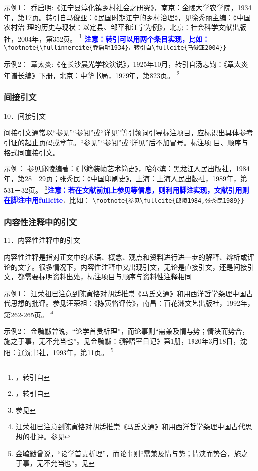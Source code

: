 \documentclass{article}
\newcommand{\qd}[1]{\textbf{\textcolor{blue}{#1}}}
\begin{document}
示例1：
乔启明:《江宁县淳化镇乡村社会之研究》，南京：金陵大学农学院，1934年，第17页。转引自马俊亚：《民国时期江宁的乡村治理》，见徐秀丽主编：《中国农村治
理的历史与现状：以定县、邹平和江宁为例》，北京：社会科学文献出版社，2004年，第352页。
\footnote{，转引自}
\qd{注意：转引可以用两个条目实现，比如：}
\verb|\footnote{\fullinnercite{乔启明1934}，转引自\fullcite{马俊亚2004}}|

示例2：
章太炎:《在长沙晨光学校演说》，1925年10月，转引自汤志钧：《章太炎年谱长编》下册，北京：中华书局，1979年，第823页。
\footnote{，转引自}


\subsubsection{间接引文}
10．间接引文

间接引文通常以“参见”“参阅”或“详见”等引领词引导标注项目，应标识出具体参考引证的起止页码或章节。“参见”“参阅”或“详见”后不加冒号。标注项
目、顺序与格式同直接引文。

示例：
参见邱陵编著：《书籍装帧艺术简史》，哈尔滨：黑龙江人民出版社，1984年，第28－29页；张秀民：《中国印刷史》，上海：上海人民出版社，1989年，第531－32页。
\footnote{参见}\qd{注意：若在文献前加上参见等信息，则利用脚注实现，文献引用则在脚注中用fullcite}，比如：
\verb|\footnote{参见\fullcite{邱陵1984,张秀民1989}}|


\subsubsection{内容性注释中的引文}
11．内容性注释中的引文

内容性注释是指对正文中的术语、概念、观点和资料进行进一步的解释、辨析或评论的文字。很多情况下，内容性注释中又出现引文，无论是直接引文，还是间接引
文，都需要标明资料出处，标注项目与顺序与资料性注释相同

示例1：
汪荣祖已注意到陈寅恪对胡适推崇《马氏文通》和用西洋哲学条理中国古代思想的批评。参见汪荣祖：《陈寅恪评传》，南昌：百花洲文艺出版社，1992年，第262-265页。
\footnote{汪荣祖已注意到陈寅恪对胡适推崇《马氏文通》和用西洋哲学条理中国古代思想的批评。参见}

示例2：
金毓黻曾说，“论学首贵析理”，而论事则“需兼及情与势；情浃而势合，施之于事，无不允当也”。见金毓黻：《静晤室日记》第1册，1920年3月18日，沈阳：辽沈书社，1993年，第11页。
\footnote{金毓黻曾说，“论学首贵析理”，而论事则“需兼及情与势；情浃而势合，施之于事，无不允当也”。见}
\end{document}

